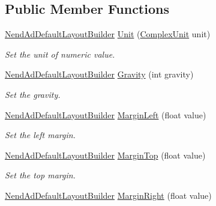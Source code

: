 \subsection*{Public Member Functions}
\begin{DoxyCompactItemize}
\item 
\hyperlink{class_nend_unity_plugin_1_1_layout_1_1_nend_ad_default_layout_builder}{Nend\+Ad\+Default\+Layout\+Builder} \hyperlink{class_nend_unity_plugin_1_1_layout_1_1_nend_ad_default_layout_builder_a663dc5a7b10bad1367e492548e87e9f2}{Unit} (\hyperlink{namespace_nend_unity_plugin_1_1_layout_a506052e088d9ad5e6fd3095641e044d3}{Complex\+Unit} unit)
\begin{DoxyCompactList}\small\item\em Set the unit of numeric value. \end{DoxyCompactList}\item 
\hyperlink{class_nend_unity_plugin_1_1_layout_1_1_nend_ad_default_layout_builder}{Nend\+Ad\+Default\+Layout\+Builder} \hyperlink{class_nend_unity_plugin_1_1_layout_1_1_nend_ad_default_layout_builder_abebe8725e88408ea8c7ff349bdb2f3c1}{Gravity} (int gravity)
\begin{DoxyCompactList}\small\item\em Set the gravity. \end{DoxyCompactList}\item 
\hyperlink{class_nend_unity_plugin_1_1_layout_1_1_nend_ad_default_layout_builder}{Nend\+Ad\+Default\+Layout\+Builder} \hyperlink{class_nend_unity_plugin_1_1_layout_1_1_nend_ad_default_layout_builder_a48f8d895cc3d180a6307ab6ab9227d28}{Margin\+Left} (float value)
\begin{DoxyCompactList}\small\item\em Set the left margin. \end{DoxyCompactList}\item 
\hyperlink{class_nend_unity_plugin_1_1_layout_1_1_nend_ad_default_layout_builder}{Nend\+Ad\+Default\+Layout\+Builder} \hyperlink{class_nend_unity_plugin_1_1_layout_1_1_nend_ad_default_layout_builder_ab9f41905e937c3c1c7635a7ca68c31cf}{Margin\+Top} (float value)
\begin{DoxyCompactList}\small\item\em Set the top margin. \end{DoxyCompactList}\item 
\hyperlink{class_nend_unity_plugin_1_1_layout_1_1_nend_ad_default_layout_builder}{Nend\+Ad\+Default\+Layout\+Builder} \hyperlink{class_nend_unity_plugin_1_1_layout_1_1_nend_ad_default_layout_builder_a3957d78ca3ec6666e7300460f21d19f9}{Margin\+Right} (float value)

\end{DoxyCompactItemize}
